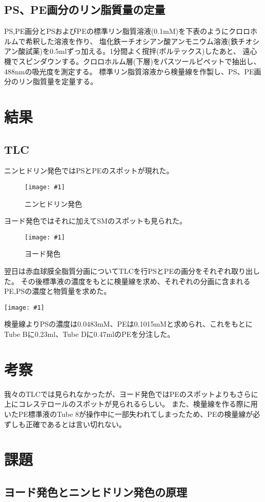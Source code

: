 \documentclass[a4paper,papersize,dvipdfmx]{jsarticle}
\newcommand{\pict}[2]{\begin{center} \texttt{[image: \#1]} \end{center}}   %
\newcommand{\piccap}[3]{\begin{figure}[H] \centering \texttt{[image: \#1]} \caption{#3} \label{fig {#1}} \end{figure}} %
\begin{document}
\subsection*{PS、PE画分のリン脂質量の定量}

PS,PE画分とPSおよびPEの標準リン脂質溶液(0.1mM)を下表のようにクロロホルムで希釈した溶液を作り、
塩化鉄ーチオシアン酸アンモニウム溶液(鉄チオシアン酸試薬)を0.5mlずっ加える。1分間よく撹拌(ボルテックス)したあと、
遠心機でスピンダウンする。クロロホルム層(下層)をパスツールピペットで抽出し、488nmの吸光度を測定する。
標準リン脂質溶液から検量線を作製し、PS、PE画分のリン脂質量を定量する。




\section*{結果}

\subsection*{TLC}
ニンヒドリン発色ではPSとPEのスポットが現れた。
\piccap{images/nin.jpg}{5}{ニンヒドリン発色}
ヨード発色ではそれに加えてSMのスポットも見られた。
\piccap{images/yodo.jpg}{5}{ヨード発色}


翌日は赤血球膜全脂質分画についてTLCを行PSとPEの画分をそれぞれ取り出した。
その後標準液の濃度をもとに検量線を求め、それぞれの分画に含まれるPE,PSの濃度と物質量を求めた。
\pict{images/graph.png}{10}
検量線よりPSの濃度は0.0483mM、PEは0.1015mMと求められ、これをもとにTube Bに0.23ml、Tube Dに0.47mlのPEを分注した。


\section*{考察}
我々のTLCでは見られなかったが、ヨード発色ではPEのスポットよりもさらに上にコレステロールのスポットが見られるらしい。
また、検量線を作る際に用いたPE標準液のTube 8が操作中に一部失われてしまったため、PEの検量線が必ずしも正確であるとは言い切れない。

\section*{課題}

\subsection*{ヨード発色とニンヒドリン発色の原理}
\end{document}
